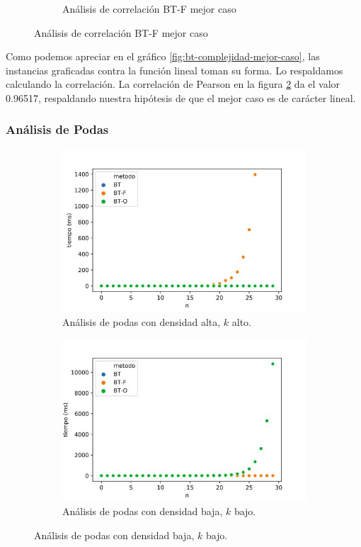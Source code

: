 \documentclass[10pt,a4paper]{article}
\begin{document}
\begin{figure}[h!]
\begin{subfigure}{0.4\linewidth}
		\caption{Análisis de correlación BT-F mejor caso}
		\label{fig:bt-correlacion-mejor-caso}
\end{subfigure}
\end{figure}
\newline
Como podemos apreciar en el gráfico \ref{fig:bt-complejidad-mejor-caso}, las instancias graficadas contra la función lineal toman su forma. Lo respaldamos calculando la correlación.
La correlación de Pearson en la figura \ref{fig:bt-correlacion-mejor-caso} da el valor 0.96517, respaldando nuestra hipótesis de que el mejor caso es de carácter lineal.
\newline
\newline
\subsubsection{Análisis de Podas}
\begin{figure}[h!]
	\centering
	\begin{subfigure}{0.45\linewidth}
		\centering
		\includegraphics[scale=0.3]{img/bt-podas-alta.jpg}
		\caption{Análisis de podas con densidad alta, $k$ alto.}
		\label{fig:bt-poda-alto}
	\end{subfigure}
	\begin{subfigure}{0.45\linewidth}
		\centering
		\includegraphics[scale=0.3]{img/bt-podas-baja.jpg}
		\caption{Análisis de podas con densidad baja, $k$ bajo.}
		\label{fig:bt-poda-bajo}
	\end{subfigure}
	\label{fig:exp-bt-podas}
\end{figure}
\end{document}
